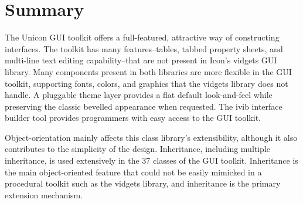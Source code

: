 \section{Summary}

The Unicon GUI toolkit offers a full-featured, attractive way of
constructing interfaces. The toolkit has many features--tables,
tabbed property sheets, and multi-line text editing capability--that
are not present in Icon's vidgets GUI
library. Many components present in both libraries are more
flexible in the GUI toolkit, supporting fonts, colors, and graphics
that the vidgets library does not handle. A pluggable theme layer
provides a flat default look-and-feel while preserving the classic
bevelled appearance when requested. The ivib interface
builder tool provides programmers with easy access to the GUI toolkit.

Object-orientation mainly affects this class library's
extensibility, although it also contributes to the
simplicity of the design. Inheritance, including multiple inheritance,
is used extensively in the 37 classes of the GUI toolkit. Inheritance
is the main object-oriented feature that could not be easily mimicked
in a procedural toolkit such as the vidgets library, and inheritance is
the primary extension mechanism.
